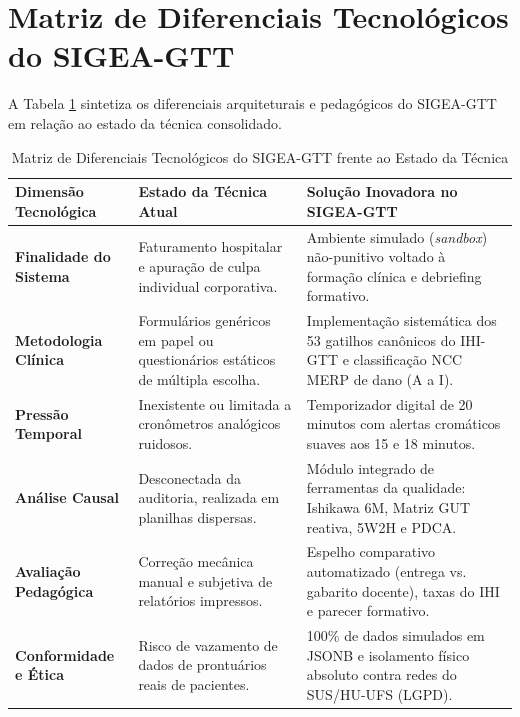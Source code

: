 \section{Matriz de Diferenciais Tecnológicos do SIGEA-GTT}
\label{sec_matriz_diferenciais}

A Tabela \ref{tab_diferenciais_tecnologicos} sintetiza os diferenciais arquiteturais e pedagógicos do SIGEA-GTT em relação ao estado da técnica consolidado.

\begin{table}[!ht]
\centering
\caption{Matriz de Diferenciais Tecnológicos do SIGEA-GTT frente ao Estado da Técnica}
\label{tab_diferenciais_tecnologicos}
\footnotesize
\begin{tabularx}{\textwidth}{p{3.2cm} p{4.2cm} X}
\toprule
\textbf{Dimensão Tecnológica} & \textbf{Estado da Técnica Atual} & \textbf{Solução Inovadora no SIGEA-GTT} \\
\midrule
\textbf{Finalidade do Sistema} & Faturamento hospitalar e apuração de culpa individual corporativa. & Ambiente simulado (\textit{sandbox}) não-punitivo voltado à formação clínica e debriefing formativo. \\
\addlinespace
\textbf{Metodologia Clínica} & Formulários genéricos em papel ou questionários estáticos de múltipla escolha. & Implementação sistemática dos 53 gatilhos canônicos do IHI-GTT e classificação NCC MERP de dano (A a I). \\
\addlinespace
\textbf{Pressão Temporal} & Inexistente ou limitada a cronômetros analógicos ruidosos. & Temporizador digital de 20 minutos com alertas cromáticos suaves aos 15 e 18 minutos. \\
\addlinespace
\textbf{Análise Causal} & Desconectada da auditoria, realizada em planilhas dispersas. & Módulo integrado de ferramentas da qualidade: Ishikawa 6M, Matriz GUT reativa, 5W2H e PDCA. \\
\addlinespace
\textbf{Avaliação Pedagógica} & Correção mecânica manual e subjetiva de relatórios impressos. & Espelho comparativo automatizado (entrega vs. gabarito docente), taxas do IHI e parecer formativo. \\
\addlinespace
\textbf{Conformidade e Ética} & Risco de vazamento de dados de prontuários reais de pacientes. & 100\% de dados simulados em JSONB e isolamento físico absoluto contra redes do SUS/HU-UFS (LGPD). \\
\bottomrule
\end{tabularx}
\end{table}

